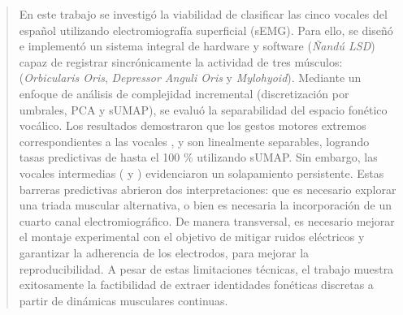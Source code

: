 \documentclass[11pt, letterpaper]{article}
\begin{document}
\begin{abstract}

En este trabajo se investigó la viabilidad de clasificar las cinco vocales del español utilizando electromiografía superficial (sEMG). Para ello, se diseñó e implementó un sistema integral de hardware y software (\textit{Ñandú LSD}) capaz de registrar sincrónicamente la actividad de tres músculos: (\textit{Orbicularis Oris}, \textit{Depressor Anguli Oris} y \textit{Mylohyoid}). Mediante un enfoque de análisis de complejidad incremental (discretización por umbrales, PCA y sUMAP), se evaluó la separabilidad del espacio fonético vocálico. Los resultados demostraron que los gestos motores extremos correspondientes a las vocales ,  y  son linealmente separables, logrando tasas predictivas de hasta el 100 \% utilizando sUMAP. Sin embargo, las vocales intermedias ( y ) evidenciaron un solapamiento persistente. Estas barreras predictivas abrieron dos interpretaciones: que es necesario explorar una triada muscular alternativa, o bien es necesaria la incorporación de un cuarto canal electromiográfico. De manera transversal, es necesario mejorar el montaje experimental con el objetivo de mitigar ruidos eléctricos y garantizar la adherencia de los electrodos, para mejorar la reproducibilidad. A pesar de estas limitaciones técnicas, el trabajo muestra exitosamente la factibilidad de extraer identidades fonéticas discretas a partir de dinámicas musculares continuas.

\end{abstract}

\vspace{7mm}
\end{document}
